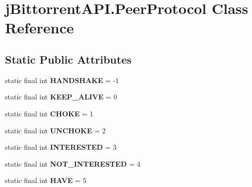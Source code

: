 \hypertarget{classj_bittorrent_a_p_i_1_1_peer_protocol}{
\section{jBittorrentAPI.PeerProtocol Class Reference}
\label{classj_bittorrent_a_p_i_1_1_peer_protocol}
}
\subsection*{Static Public Attributes}
\begin{DoxyCompactItemize}
\item 
\hypertarget{classj_bittorrent_a_p_i_1_1_peer_protocol_affed74b8fce30ff3fac019c983d124bc}{
static final int {\bfseries HANDSHAKE} = -\/1}
\label{classj_bittorrent_a_p_i_1_1_peer_protocol_affed74b8fce30ff3fac019c983d124bc}

\item 
\hypertarget{classj_bittorrent_a_p_i_1_1_peer_protocol_a0b7a2b6be5f8173e83e9f38a7990bc50}{
static final int {\bfseries KEEP\_\-ALIVE} = 0}
\label{classj_bittorrent_a_p_i_1_1_peer_protocol_a0b7a2b6be5f8173e83e9f38a7990bc50}

\item 
\hypertarget{classj_bittorrent_a_p_i_1_1_peer_protocol_a8a6b748c7158bdc8bc11ab45e297666b}{
static final int {\bfseries CHOKE} = 1}
\label{classj_bittorrent_a_p_i_1_1_peer_protocol_a8a6b748c7158bdc8bc11ab45e297666b}

\item 
\hypertarget{classj_bittorrent_a_p_i_1_1_peer_protocol_a2e085b958b7602b7cd7c3ad7c2a70d30}{
static final int {\bfseries UNCHOKE} = 2}
\label{classj_bittorrent_a_p_i_1_1_peer_protocol_a2e085b958b7602b7cd7c3ad7c2a70d30}

\item 
\hypertarget{classj_bittorrent_a_p_i_1_1_peer_protocol_a7daac5a3e8149af43bfb57e96d4fa1f0}{
static final int {\bfseries INTERESTED} = 3}
\label{classj_bittorrent_a_p_i_1_1_peer_protocol_a7daac5a3e8149af43bfb57e96d4fa1f0}

\item 
\hypertarget{classj_bittorrent_a_p_i_1_1_peer_protocol_aae9a3e36b266dbfa5baf54ad812dc8de}{
static final int {\bfseries NOT\_\-INTERESTED} = 4}
\label{classj_bittorrent_a_p_i_1_1_peer_protocol_aae9a3e36b266dbfa5baf54ad812dc8de}

\item 
\hypertarget{classj_bittorrent_a_p_i_1_1_peer_protocol_a38061fa6e3ac4f9c1b63354ed6bec10b}{
static final int {\bfseries HAVE} = 5}
\label{classj_bittorrent_a_p_i_1_1_peer_protocol_a38061fa6e3ac4f9c1b63354ed6bec10b}


\end{DoxyCompactItemize}

